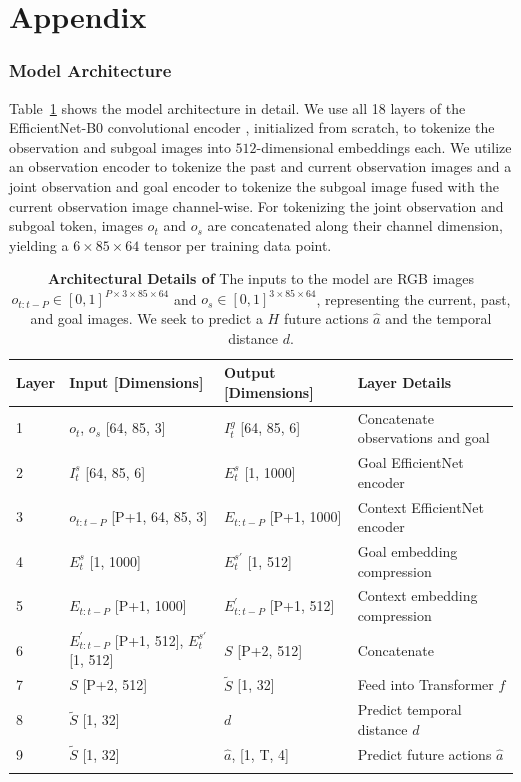 \appendix
\part*{Appendix}



\section{\ModelName Model Architecture}
\label{sec:app:architecture}

Table~\ref{tab:app:model_arch} shows the \ModelName model architecture in detail. We use all 18 layers of the EfficientNet-B0 convolutional encoder \cite{tan2020efficientnet}, initialized from scratch, to tokenize the observation and subgoal images into $512$-dimensional embeddings each.
We utilize an observation encoder to tokenize the past and current observation images and a joint observation and goal encoder to tokenize the subgoal image fused with the current observation image channel-wise. For tokenizing the joint observation and subgoal token, images $o_t$ and $o_s$ are concatenated along their channel dimension, yielding a $6\times 85 \times 64$ tensor per training data point. 

\begin{table}[ht]
\centering
{\footnotesize
\begin{tabular}{llll}
\toprule
Layer & Input [Dimensions] & Output [Dimensions] & Layer Details \\ 
\midrule
1 & $o_t$, $o_s$ [64, 85, 3] & $I_t^g$ [64, 85, 6] & Concatenate observations and goal \\
2 & $I_t^s$ [64, 85, 6] & $E_t^s$ [1, 1000] & Goal EfficientNet encoder \\
3 & $o_{t:t-P}$ [P+1, 64, 85, 3]& $E_{t:t-P}$ [P+1, 1000] & Context EfficientNet encoder \\
4 & $E_t^s$ [1, 1000] & $E_t^{s'}$ [1, 512] & Goal embedding compression \\
5 & $E_{t:t-P}$ [P+1, 1000] & $E_{t:t-P}^{'}$ [P+1, 512] & Context embedding compression \\
6 & $E_{t:t-P}^{'}$ [P+1, 512], $E_t^{s'}$ [1, 512] & $S$ [P+2, 512] & Concatenate \\
7 & $S$ [P+2, 512] & $\tilde{S}$ [1, 32] & Feed into Transformer $f$ \\
8 & $\tilde{S}$ [1, 32] & $d$ & Predict temporal distance $d$ \\
9 & $\tilde{S}$ [1, 32] & $\hat{a}$, [1, T, 4] & Predict future actions $\hat{a}$ \\
\bottomrule \\
\end{tabular}}
\caption{\textbf{Architectural Details of \ModelName} The inputs to the model are RGB images $o_{t:t-P} \in [0, 1]^{P \times 3\times 85 \times 64}$ and $o_s\in [0, 1]^{3\times 85 \times 64}$, representing the current, past, and goal images. We seek to predict a $H$ future actions $\hat{a}$ and the temporal distance $d$. }\label{tab:app:model_arch}
\end{table}

